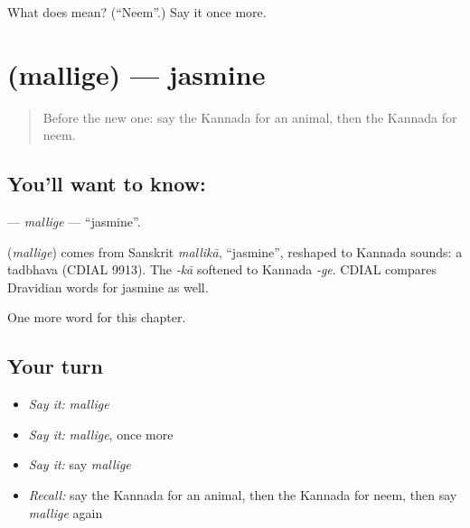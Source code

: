 \begin{tcolorbox}[breakable,colback=teal!4,colframe=teal!35!black,title={Before you move on}]
What does  mean? (\textquotedblleft{}Neem\textquotedblright{}.) Say it once more.
\end{tcolorbox}
\section[\texorpdfstring{\kn{ಮಲ್ಲಿಗೆ} (mallige)}{ಮಲ್ಲಿಗೆ (mallige)}]{ (mallige) — jasmine}

\label{lesson:KA-C225-mallige}



\begin{quote}
Before the new one: say the Kannada for an animal, then the Kannada for neem.
\end{quote}

\subsection*{You'll want to know: }
\textbf{} — \emph{mallige} — \textquotedblleft{}jasmine\textquotedblright{}.

\begin{cousinweb}
\textbf{} (\emph{mallige}) comes from Sanskrit \emph{mallikā}, \textquotedblleft{}jasmine\textquotedblright{}, reshaped to Kannada sounds: a tadbhava (CDIAL 9913). The \emph{-kā} softened to Kannada \emph{-ge}. CDIAL compares Dravidian words for jasmine as well.
\end{cousinweb}

\begin{grammarlens}[title={What you've built}]
One more word for this chapter.
\end{grammarlens}

\subsection*{Your turn}
\begin{itemize}
\raggedright
  \item \emph{Say it:} \emph{mallige}
  \item \emph{Say it:} \emph{mallige}, once more
  \item \emph{Say it:} say \emph{mallige}
  \item \emph{Recall:} say the Kannada for an animal, then the Kannada for neem, then say \emph{mallige} again
\end{itemize}

